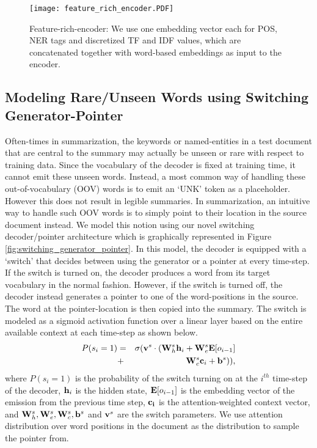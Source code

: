 \documentclass[11pt]{article}
\begin{document}
\begin{figure}[ht]
    \vspace{-0.3in}
	\centering
  \texttt{[image: feature\_rich\_encoder.PDF]}
  \vspace{-0.6in}
	\caption{{\small Feature-rich-encoder: We use one embedding vector each for POS, NER tags and discretized TF and IDF values, which are concatenated together with word-based embeddings as input to the encoder.}}
	\label{fig:feature_rich_encoder}
\end{figure}

\subsection{Modeling Rare/Unseen Words using Switching Generator-Pointer}\label{sec:switch}
Often-times in summarization, the keywords or named-entities in a test document that are central to the summary may actually be unseen or rare with respect to training data. Since the vocabulary of the decoder is fixed at training time, it cannot emit these unseen words. Instead, a most common way of handling these out-of-vocabulary (OOV) words is to emit  an `UNK' token as a placeholder. However this does not result in legible summaries. In summarization, an intuitive way to handle such OOV words is to simply point to their location in the source document instead. We model this notion using our novel switching decoder/pointer architecture which is graphically represented in Figure \ref{fig:switching_generator_pointer}. In this model, the decoder is equipped with a `switch' that decides between using the generator or a pointer at every time-step. If the switch is turned on, the decoder produces a word from its target vocabulary in the normal fashion. However, if the switch is turned off, the decoder instead generates a pointer to one of the word-positions in the source. The word at the pointer-location is then copied into the summary.  The switch is modeled as a sigmoid activation function over a linear layer based on the entire available context at each time-step as shown below.
\begin{eqnarray}
P(s_i=1) &=& \sigma({{\bf v}^s}\cdot({\bf W}^s_h{\bf h}_i + {\bf W}^s_e{\bf E}[o_{i-1}] \nonumber\\
             &+& {\bf W}^s_c{\bf c}_i + {\bf b}^s)),\nonumber
\end{eqnarray}
where $P(s_i=1)$ is the probability of the switch turning on at the $i^{th}$ time-step of the decoder, ${\bf h}_i$ is the hidden state,  ${\bf E}[o_{i-1}]$ is the embedding vector of the emission from the previous time step, ${\bf c_i}$ is the attention-weighted context vector, and ${\bf W}_h^s, {\bf W}_e^s, {\bf W}_c^s, {\bf b}^s$ and ${\bf v}^s$ are the switch parameters. We use attention distribution over word positions in the document as the distribution to sample the pointer from.
\end{document}
